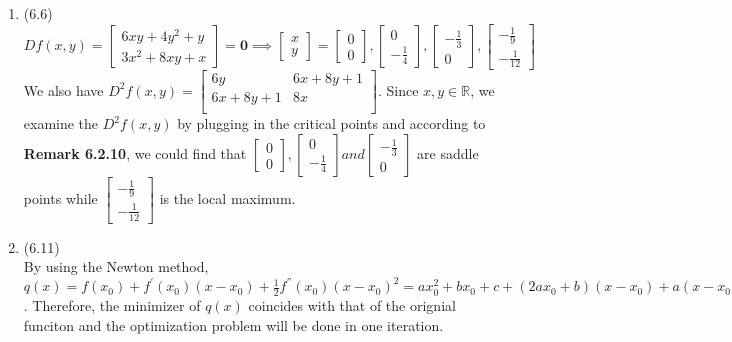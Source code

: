 \documentclass[letterpaper,12pt]{article}
\theoremstyle{definition}
\begin{document}
\begin{enumerate}
	 \item(6.6)\\
	$Df(x, y) = \begin{bmatrix} 6xy + 4y^2 + y \\ 3x^2 + 8xy +x \end{bmatrix} = \textbf{0} \implies \begin{bmatrix} x \\ y \end{bmatrix} = \begin{bmatrix} 0 \\ 0 \end{bmatrix},  \begin{bmatrix} 0 \\ -\frac{1}{4} \end{bmatrix},  \begin{bmatrix} -\frac{1}{3} \\ 0 \end{bmatrix},  \begin{bmatrix} -\frac{1}{9} \\ -\frac{1}{12} \end{bmatrix}  $\\
	We also have $D^{2}f(x, y) = \begin{bmatrix} 6y & 6x + 8y + 1\\ 6x + 8y + 1 & 8x \\\end{bmatrix}$. Since $x, y \in \mathbb{R}$, we examine the $D^{2}f(x, y)$ by plugging in the critical points and according to \textbf{Remark 6.2.10}, we could find that $\begin{bmatrix} 0 \\ 0 \end{bmatrix}, \begin{bmatrix} 0 \\ -\frac{1}{4} \end{bmatrix} and  \begin{bmatrix} -\frac{1}{3} \\ 0 \end{bmatrix}$ are saddle points while $\begin{bmatrix} -\frac{1}{9} \\ -\frac{1}{12}\end{bmatrix}$ is the local maximum.\\

	\item(6.11)\\
	By using the Newton method, $q(x) = f(x_{0}) + f^{'}(x_{0})(x - x_{0}) + \frac{1}{2}f^{''}(x_{0})(x - x_{0})^{2} = ax_{0}^2 + bx_{0} + c +(2ax_{0} + b)(x - x_{0}) + a(x - x_{0})^{2} = zx^2 + bx +c$. Therefore, the minimizer of $q(x)$ coincides with that of the orignial funciton and the optimization problem will be done in one iteration.\\


\end{enumerate}
\end{document}
